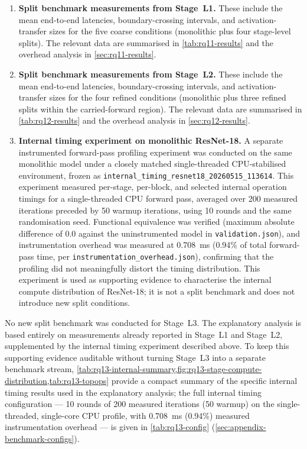\begin{enumerate}
    \item \textbf{Split benchmark measurements from Stage~L1.} These include the mean end-to-end latencies, boundary-crossing intervals, and activation-transfer sizes for the five coarse conditions (monolithic plus four stage-level splits). The relevant data are summarised in \cref{tab:rq11-results} and the overhead analysis in \cref{sec:rq11-results}.

    \item \textbf{Split benchmark measurements from Stage~L2.} These include the mean end-to-end latencies, boundary-crossing intervals, and activation-transfer sizes for the four refined conditions (monolithic plus three refined splits within the carried-forward region). The relevant data are summarised in \cref{tab:rq12-results} and the overhead analysis in \cref{sec:rq12-results}.

    \item \textbf{Internal timing experiment on monolithic ResNet-18.} A separate instrumented forward-pass profiling experiment was conducted on the same monolithic model under a closely matched single-threaded CPU-stabilised environment, frozen as \texttt{internal\_timing\_resnet18\_20260515\_113614}. This experiment measured per-stage, per-block, and selected internal operation timings for a single-threaded CPU forward pass, averaged over 200 measured iterations preceded by 50 warmup iterations, using 10 rounds and the same randomisation seed. Functional equivalence was verified (maximum absolute difference of 0.0 against the uninstrumented model in \texttt{validation.json}), and instrumentation overhead was measured at 0.708~ms (0.94\% of total forward-pass time, per \texttt{instrumentation\_overhead.json}), confirming that the profiling did not meaningfully distort the timing distribution. This experiment is used as supporting evidence to characterise the internal compute distribution of ResNet-18; it is not a split benchmark and does not introduce new split conditions.
\end{enumerate}

No new split benchmark was conducted for Stage~L3. The explanatory analysis is based entirely on measurements already reported in Stage~L1 and Stage~L2, supplemented by the internal timing experiment described above. To keep this supporting evidence auditable without turning Stage~L3 into a separate benchmark stream, \cref{tab:rq13-internal-summary,fig:rq13-stage-compute-distribution,tab:rq13-topops} provide a compact summary of the specific internal timing results used in the explanatory analysis; the full internal timing configuration --- 10 rounds of 200 measured iterations (50 warmup) on the single-threaded, single-core CPU profile, with 0.708~ms (0.94\%) measured instrumentation overhead --- is given in \cref{tab:rq13-config} (\cref{sec:appendix-benchmark-configs}).


